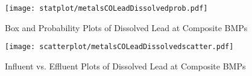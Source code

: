         \begin{figure}[hb]   %
            \centering
            \texttt{[image: statplot/metalsCOLeadDissolvedprob.pdf]}
            \caption{Box and Probability Plots of Dissolved Lead at Composite BMPs}
        \end{figure}         %
        
        
        \begin{figure}[hb]   %
            \centering
            \texttt{[image: scatterplot/metalsCOLeadDissolvedscatter.pdf]}
            \caption{Influent vs. Effluent Plots of Dissolved Lead at Composite BMPs}
        \end{figure}         %
        \clearpage
        